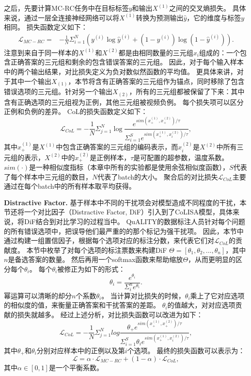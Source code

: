 之后，先要计算MC-RC任务中在目标标签$y$和输出$X^{(1)}$之间的交叉熵损失。
具体来说，通过一层全连接神经网络可以将$X^{(1)}$转换为预测输出$\hat y$，它的维度与标签$y$相同。
损失函数定义如下：
\begin{equation}
    \begin{split}
    \mathcal L_{MC-RC}=& -\frac{1}{N}\Sigma^N_{i=1}(y^{(i)}\log\hat y^{(i)}+(1-y^{(i)})\log(1-\hat y^{(i)})).
    \end{split}
\end{equation}
注意到来自于同一样本的$X^{(1)}$和$X^{(2)}$都是由相同数量的三元组$x_i$组成的：一个包含正确答案的三元组和剩余的包含错误答案的三元组。
因此，对于每个输入样本中的两个输出结果，对比损失定义为负对数似然函数的平均值。
更具体来讲，对于其中一个输出$X_{(1)}$，本节将含有正确答案的三元组作为锚点，同时移除了包含错误选项的三元组。针对另一个输出$X_{(2)}$，所有的三元组都被保留了下来：其中含有正确选项的三元组视为正例，其他三元组被视频负例。
每个损失项可以区分正例和负例的差异。
CoL的损失函数定义如下：
\begin{equation}
    \mathcal L_{CoL}=-\frac{1}{N}\Sigma^N_{j=1}\log \frac{e^{sim(x^{(1)}_+,x^{(2)}_+)/ \tau}}{\Sigma^S_{i=1} e^{sim(x^{(1)}_+,x^{(2)}_i)/ \tau}},
\end{equation}
其中$x^{(1)}_+$是$X^{(1)}$中包含正确答案的三元组的编码表示，而$x^{(2)}_i$是$X^{(2)}$中所有三元组的表示，$X^{(2)}$中的$x^{(2)}_+$是正例样本，$\tau$是可配置的超参数，温度系数。
$sim(\cdot)$是一种相似度指标（本章中所有的实验都是使用余弦相似度函数），$S$代表了每个样本中三元组的数目，$N$代表了batch的大小。
聚合后的对比损失$\mathcal L_{CoL}$主要通过在每个batch中的所有样本取平均获得。

\noindent \textbf{Distractive Factor.}
基于样本中不同的干扰项会对模型造成不同程度的干扰，本节还将一个对比因子（Distractive Factor, DiF）引入到了CoLISA模型，具体来说，将DiF结合到对比学习的过程当中。
QuALITY的数据标注人员针对每个问题的所有错误选项中，把误导他们最严重的的那个标记为强干扰项。
因此，本节中通过构建一组置信因子，根据每个选项对应的标注分数，来代表它们对$\mathcal L_{CoL}$的贡献度。
本节中枚举了对每个选项的标注票数来构建DiF $\Theta=[\theta_1, \theta_2, ..., \theta_n]$，其中$n$是备选答案的数量。
然后再用一个softmax函数来帮助缩放$\Theta$，从而更明显的区分每个$\theta_i$。
每个$\theta_i$被修正为如下的形式：
\begin{equation}
    \theta_i=\frac{e^{\theta_i}}{\Sigma^n_i e^{\theta_i}}.
\end{equation}
幂运算可以清晰的却分$n$个系数$\theta_i$。
当计算对比损失的时候，$\theta_i$乘上了它对应选项的相似度的值，来衡量正确答案和干扰答案的差距。
$\theta_i$的值越大，对对应选项贡献的损失就越多。
经过上述分析，对比损失函数可以改进为如下：
\begin{equation}
    \mathcal L_{CoL}=-\frac{1}{N}\Sigma^N_{j=1}log \frac{\theta_+e^{sim(x^{(1)}_+,x^{(2)}_+)/ \tau}}{\Sigma^S_{i=1} \theta_ie^{sim(x^{(1)}_+,x^{(2)}_i)/ \tau}},
\end{equation}
其中$\theta_+$和$\theta_i$分别对应样本中的正例以及第$i$个选项。
最终的损失函数可以表示为：
\begin{equation}
    \mathcal L=\alpha \cdot \mathcal L_{MC-RC}+(1-\alpha) \cdot \mathcal L_{CoL},
\end{equation}
其中$\alpha \in[0,1]$是一个平衡系数。


